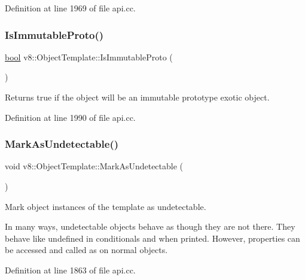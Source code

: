 Definition at line 1969 of file api.\+cc.

\mbox{\label{classv8_1_1ObjectTemplate_a76c12ee7be283bd3b007d062686dc0ed}} 
\subsubsection{\texorpdfstring{Is\+Immutable\+Proto()}{IsImmutableProto()}}
{\footnotesize\ttfamily \mbox{\hyperlink{classbool}{bool}} v8\+::\+Object\+Template\+::\+Is\+Immutable\+Proto (\begin{DoxyParamCaption}{ }\end{DoxyParamCaption})}

Returns true if the object will be an immutable prototype exotic object. 

Definition at line 1990 of file api.\+cc.

\mbox{\label{classv8_1_1ObjectTemplate_a7e40ef313b44c2ad336c73051523b4f8}} 
\subsubsection{\texorpdfstring{Mark\+As\+Undetectable()}{MarkAsUndetectable()}}
{\footnotesize\ttfamily void v8\+::\+Object\+Template\+::\+Mark\+As\+Undetectable (\begin{DoxyParamCaption}{ }\end{DoxyParamCaption})}

Mark object instances of the template as undetectable.

In many ways, undetectable objects behave as though they are not there. They behave like \textquotesingle{}undefined\textquotesingle{} in conditionals and when printed. However, properties can be accessed and called as on normal objects. 

Definition at line 1863 of file api.\+cc.

\mbox{\label{classv8_1_1ObjectTemplate_a092e8adf656359d4dead412d28313ebb}} 
